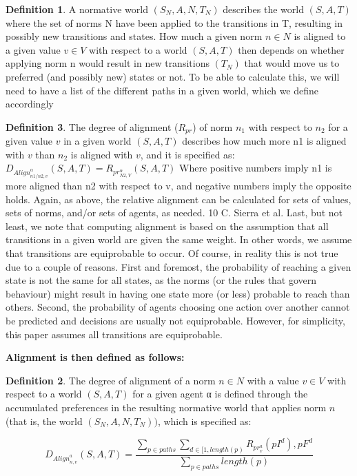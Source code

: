 \documentclass{article}
\theoremstyle{definition}
\newtheorem{definition}{Definition}
\theoremstyle{remark}
\begin{document}
\begin{definition} A normative world $(S_N , A, N, T_N )$ describes the world $(S, A, T)$
where the set of norms N have been applied to the transitions in T, resulting in
possibly new transitions and states.
How much a given norm $n \in N$ is aligned to a given value $v \in V$ with respect
to a world $(S, A, T)$ then depends on whether applying norm n would result in
new transitions $(T_N)$ that would move us to preferred (and possibly new) states
or not. To be able to calculate this, we will need to have a list of the different
paths in a given world, which we define accordingly
\end{definition}
 
 \begin{definition} The degree of alignment ($R_{pr}$) of norm $n_1$ with respect to $n_2$ for a given value $v$ in a given world $(S, A, T)$ describes how much more n1 is aligned with $v$ than $n_2$ is aligned with $v$, and it is specified as:
$D_{Align}_{n1/n2,v}^{\alpha}(S, A, T) = R_{pr}_{N2, V}^{\alpha}(S, A, T)$
Where positive numbers imply n1 is more aligned than n2 with respect to v, and
negative numbers imply the opposite holds.
Again, as above, the relative alignment can be calculated for sets of values,
sets of norms, and/or sets of agents, as needed.
10 C. Sierra et al.
Last, but not least, we note that computing alignment is based on the assumption that all transitions in a given world are given the same weight. In other
words, we assume that transitions are equiprobable to occur. Of course, in reality
this is not true due to a couple of reasons. First and foremost, the probability of
reaching a given state is not the same for all states, as the norms (or the rules
that govern behaviour) might result in having one state more (or less) probable to reach than others. Second, the probability of agents choosing one action
over another cannot be predicted and decisions are usually not equiprobable.
However, for simplicity, this paper assumes all transitions are equiprobable.

\textbf{Alignment is then defined as follows:}

\begin{definition} The degree of alignment of a norm $n \in N$ with a value $v \in V$ with
respect to a world $(S, A, T)$ for a given agent α is defined through the accumulated
preferences in the resulting normative world that applies norm $n$ (that is, the
world $(S_N , A, N, T_N ))$, which is specified as:

\begin{equation*}
D_{Align}_{n, v}^{a}(S, A, T) = \frac{\sum_{p \in paths} \sum_{d \in [1, length(p)} R_{pr}_{v}^{a}(pI^{d}),pF^{d}}{\sum_{p \in paths} length(p)}    
\end{equation*}


\end{definition}
\end{definition}
\end{document}
